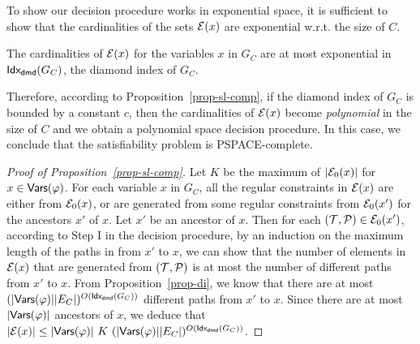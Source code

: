 To show our decision procedure works in exponential space, it is sufficient to show that the cardinalities of the sets $\mathcal{E}(x)$ are exponential w.r.t. the size of $C$.

\begin{proposition}\label{prop-sl-comp}
The cardinalities of $\mathcal{E}(x)$ for the variables $x$ in $G_C$ are at most exponential in ${\sf Idx_{dmd}}(G_C)$, the diamond index of $G_C$.
\end{proposition}
Therefore, according to Proposition~\ref{prop-sl-comp}, if the diamond index of $G_C$ is bounded by a constant $c$, then the cardinalities of $\mathcal{E}(x)$ become \emph{polynomial} in the size of $C$ and we obtain a polynomial space decision procedure. In this case, we conclude that the satisfiability problem is PSPACE-complete.

\begin{proof}[Proof of Proposition~\ref{prop-sl-comp}]
Let $K$ be the maximum of $|\mathcal{E}_0(x)|$ for $x \in \mathsf{Vars}(\varphi)$. 
For each variable $x$ in $G_C$, all the regular constraints in $\mathcal{E}(x)$ are either from $\mathcal{E}_0(x)$, or are generated from some regular constraints from $\mathcal{E}_0(x')$ for the ancestors $x'$ of $x$. Let $x'$ be an ancestor of $x$. Then for each $(\mathcal{T}, \mathcal{P}) \in \mathcal{E}_0(x')$, according to Step I in the decision procedure, by an induction on the maximum length of the paths in from $x'$ to $x$, we can show that the number of elements in $\mathcal{E}(x)$ that are generated from $(\mathcal{T}, \mathcal{P})$ is at most the number of different paths from $x'$ to $x$. 
%
From Proposition~\ref{prop-di}, we know that there are at most $(|\mathsf{Vars}(\varphi)||E_C|)^{O({\sf Idx_{dmd}}(G_C))}$ different paths from $x'$ to $x$. Since there are at most $|\mathsf{Vars}(\varphi)|$ ancestors of $x$, we deduce that $|\cE(x)| \le |\vars(\varphi)|\ K\ (|\vars(\varphi)||E_C|)^{O(\dmdidx(G_C))}$.
\end{proof}

